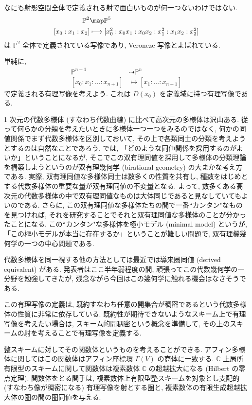 \documentclass[openany, a4paper, oneside]{jsbook}
\begin{document}
\begin{ex}
なにも射影空間全体で定義される射で面白いものが何一つないわけではない.
\begin{align}
 \mathbb{P}^2
 &\map
 \mathbb{P}^5 \\
 [x_0:x_1:x_2]
 &\longmapsto
 [x_0^2:x_0x_1:x_0x_2:x_1^2:x_1x_2:x_2^2]
\end{align}
は $\mathbb{P}^2$ 全体で定義されている写像であり, Veroneze 写像とよばれている. \fin
\end{ex}
\begin{ex}
単純に,
\begin{align}
 \mathbb{P}^{n+1}
 &\dashrightarrow
 \mathbb{P}^n \\
 [x_0:x_1:\dots:x_{n+1}]
 &\longmapsto
 [x_1:\dots:x_{n+1}]
\end{align}
で定義される有理写像を考えよう.
これは $D (x_0)$ を定義域に持つ有理写像である. \fin
\end{ex}

\begin{rem}
1 次元の代数多様体 (すなわち代数曲線) に比べて高次元の多様体は沢山ある.
従って何らかの分類を考えたいときに多様体一つ一つをみるのではなく,
何かの同値関係でまず代数多様体を区別しておいて,
その上で各類同士の分類を考えようとするのは自然なことであろう.
では, 「どのような同値関係を採用するのがよいか」ということになるが,
そこでこの双有理同値を採用して多様体の分類理論を構築しようというのが双有理幾何学 (birational geometry) の大まかな考え方である.
実際, 双有理同値な多様体同士は数多くの性質を共有し, 種数をはじめとする代数多様体の重要な量が双有理同値の不変量となる.
よって, 数多くある高次元の代数多様体の中で双有理同値なものは大体同じであると見なしていてもよいのである.
さらに, この双有理同値な多様体たちの間で一番``カンタン"なものを見つければ,
それを研究することでそれと双有理同値な多様体のことが分かったことになる.
この``カンタン"な多様体を極小モデル (minimal model) というが,
「この極小モデルが本当に存在するか」ということが難しい問題で, 双有理機幾何学の一つの中心問題である.

代数多様体を同一視する他の方法としては最近では導来圏同値 (derived equivalent) がある.
発表者はここ半年弱程度の間, 頑張ってこの代数幾何学の一分野を勉強してきたが,
残念ながら今回はこの幾何学に触れる機会はなさそうである. \fin
\end{rem}
\begin{rem}
この有理写像の定義は, 既約すなわち任意の開集合が稠密であるという代数多様体の性質に非常に依存している.
既約性が期待できないようなスキーム上で有理写像を考えたい場合は,
スキーム的開稠密という概念を準備して, その上のスキームの射を考えることで有理写像を定義する. \fin
\end{rem}
\begin{rem}
整スキームに対してその関数体というものを考えることができる.
アフィン多様体に関してはこの関数体はアフィン座標環 $\Gamma (V)$ の商体に一致する.
$\mathbb{C}$ 上局所有限型のスキームに関して関数体は複素数体 $\mathbb{C}$ の超越拡大になる (Hilbert の零点定理).
関数体をとる関手は, 複素数体上有限型整スキームを対象とし支配的 (すなわち像が稠密になる) 有理写像を射とする圏と,
複素数体の有限生成超越拡大体の圏の間の圏同値を与える. \fin
\end{rem}
\end{document}
